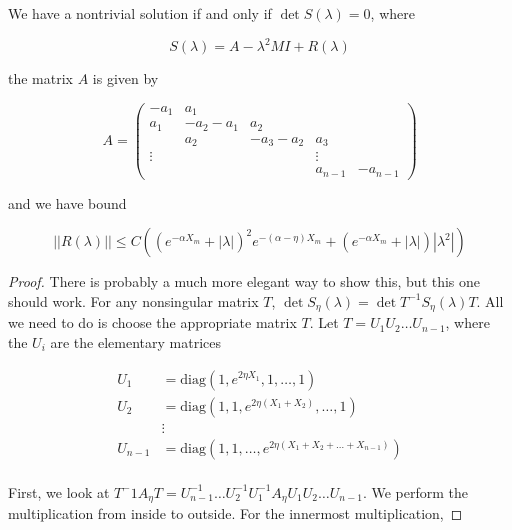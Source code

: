 \documentclass[thesis.tex]{subfiles}
\begin{document}

\begin{lemma}
We have a nontrivial solution if and only if $\det S(\lambda) = 0$, where

\[
S(\lambda) = A - \lambda^2 M I + R(\lambda)
\]

the matrix $A$ is given by

\begin{equation}\label{defA}
A = \begin{pmatrix}
-a_1 & a_1 \\
a_1 & -a_2 - a_1 & a_2 \\
& a_2 & -a_3 - a_2 & a_3 \\
\vdots & & & \vdots \\
& & & a_{n-1} & -a_{n-1} 
\end{pmatrix}
\end{equation}

and we have bound

\begin{equation}
||R(\lambda)|| \leq C 
\left( (e^{-\alpha X_m} + |\lambda|)^2 e^{-(\alpha - \eta)X_m}  
+ (e^{-\alpha X_m} + |\lambda| )|\lambda^2| \right)
\end{equation}

\begin{proof}
There is probably a much more elegant way to show this, but this one should work. For any nonsingular matrix $T$, $\det S_\eta(\lambda) = \det T^{-1} S_\eta(\lambda) T$. All we need to do is choose the appropriate matrix $T$. Let $T = U_1 U_2 \dots U_{n-1}$, where the $U_i$ are the elementary matrices

\begin{align*}
U_1 &= \text{diag}(1, e^{2 \eta X_1}, 1, \dots, 1) \\
U_2 &= \text{diag}(1, 1, e^{2 \eta (X_1 + X_2)}, \dots, 1) \\
&\vdots \\
U_{n-1} &= \text{diag}(1, 1, \dots, e^{2 \eta (X_1 + X_2 + \dots + X_{n-1})}) \\
\end{align*}

First, we look at $T^-1 A_\eta T = U_{n-1}^{-1} \dots U_2^{-1} U_1^{-1} A_\eta U_1 U_2 \dots U_{n-1}$. We perform the multiplication from inside to outside. For the innermost multiplication,


\end{proof}
\end{lemma}
\end{document}
